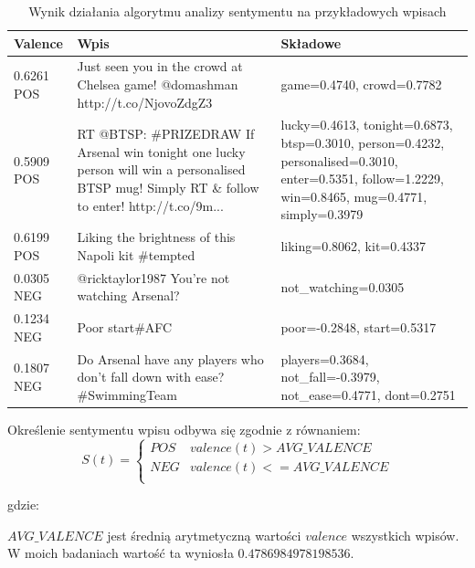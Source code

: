 \clearpage \begin{table}[ht!]
\begin{center}  
\begin{tabular}{|p{12mm}|p{70mm}|>{\raggedright\arraybackslash}p{60mm}|}
\hline
Valence & Wpis & Składowe 
\\ \hline 
0.6261 POS & Just seen you in the crowd at Chelsea game! @domashman http://t.co/NjovoZdgZ3 & {game=0.4740, crowd=0.7782}
\\ \hline
0.5909 POS & RT @BTSP: \#PRIZEDRAW If Arsenal win tonight one lucky person
will win a personalised BTSP mug! Simply RT \& follow to enter!
http://t.co/9m... & {lucky=0.4613, tonight=0.6873, btsp=0.3010, person=0.4232, personalised=0.3010, enter=0.5351, follow=1.2229, win=0.8465, mug=0.4771, simply=0.3979}
\\ \hline
0.6199 POS & Liking the brightness of this Napoli kit \#tempted &
{liking=0.8062, kit=0.4337} \\ \hline
0.0305 NEG & @ricktaylor1987 You're not watching Arsenal? &
{not\_watching=0.0305} \\ \hline
0.1234 NEG & Poor start\#AFC & {poor=-0.2848, start=0.5317}
\\ \hline
0.1807 NEG & Do Arsenal have any players who don't fall down with ease?
\#SwimmingTeam & {players=0.3684, not\_fall=-0.3979, not\_ease=0.4771,
dont=0.2751} \\ \hline
\end{tabular} 
\end{center} 
\caption{Wynik działania algorytmu analizy sentymentu na przykładowych wpisach}
\label{tab:valence-przyklad}
\end{table}

Określenie sentymentu wpisu odbywa się zgodnie z równaniem:
\begin{equation}
S(t) =
\begin{cases}
POS & valence(t) > AVG\_VALENCE \\
NEG & valence(t) <= AVG\_VALENCE \\
\end{cases}
\end{equation}

gdzie:

$AVG\_VALENCE$ jest średnią arytmetyczną wartości $valence$
wszystkich wpisów. W moich badaniach wartość ta wyniosła $0.4786984978198536$.

